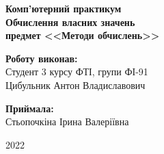 \begin{titlepage}
    \begin{center}
        \begin{spacing}{1.5}
            \textbf{\Large{Комп'ютерний практикум }} \\
            \textbf{\Large{Обчислення власних значень}} \\ 
            \vspace{1cm}\textbf{\large{предмет <<Методи обчислень>>}}
        \end{spacing}
    \end{center}

    \vspace{15em}

    \newlength{\maxname}

    \hfill\parbox{\maxname}{
        \begin{spacing}{1.1}
            \small{\textbf{Роботу виконав:}} \\ 
            \small{Студент 3 курсу ФТІ, групи ФІ-91} \\
            \small{Цибульник Антон Владиславович} \\
        \end{spacing}
    }

    \hfill\parbox{\maxname}{
        \begin{spacing}{1.1}
            \small{\textbf{Приймала:}} \\ 
            \small{Стьопочкіна Ірина Валеріївна} \\
        \end{spacing}
    }

    \vspace{\fill}
    
    \begin{center}
        \small{2022}
    \end{center}
    
\end{titlepage}